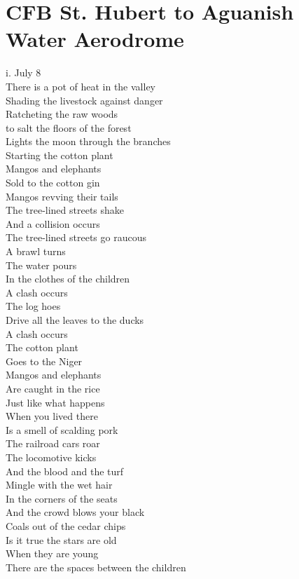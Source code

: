 \documentclass[smalldemyvopaper,11pt,twoside,onecolumn,openright,extrafontsizes]{memoir}
\begin{document}
\chapter{CFB St. Hubert to Aguanish Water Aerodrome}
i.  July 8
\\There is a pot of heat in the valley
\\Shading the livestock against danger
\\Ratcheting the raw woods
\\to salt the floors of the forest
\\Lights the moon through the branches
\\Starting the cotton plant
\\Mangos and elephants
\\Sold to the cotton gin
\\Mangos revving their tails
\\The tree-lined streets shake
\\And a collision occurs
\\The tree-lined streets go raucous
\\A brawl turns
\\The water pours
\\In the clothes of the children
\\A clash occurs
\\The log hoes
\\Drive all the leaves to the ducks
\\A clash occurs
\\The cotton plant
\\Goes to the Niger
\\Mangos and elephants
\\Are caught in the rice
\\Just like what happens
\\When you lived there
\\Is a smell of scalding pork
\\The railroad cars roar
\\The locomotive kicks
\\And the blood and the turf
\\Mingle with the wet hair
\\In the corners of the seats
\\And the crowd blows your black
\\Coals out of the cedar chips
\\Is it true the stars are old
\\When they are young
\\There are the spaces between the children
\end{document}
